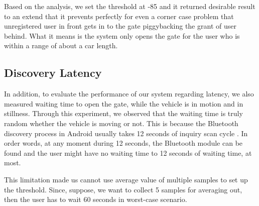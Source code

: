 Based on the analysis, we set the threshold at -85 and it returned desirable result to an extend that it prevents perfectly for even a corner case problem that unregistered user in front gets in to the gate piggybacking the grant of user behind. What it means is the system only opens the gate for the user who is within a range of about a car length.
\subsection{Discovery Latency}
In addition, to evaluate the performance of our system regarding latency, we also measured waiting time to open the gate, while the vehicle is in motion and in stillness. Through this experiment, we observed that the waiting time is truly random whether the vehicle is moving or not. This is because the Bluetooth discovery process in Android usually takes 12 seconds of inquiry scan cycle \cite {btcycle}. In order words, at any moment during 12 seconds, the Bluetooth module can be found and the user might have no waiting time to 12 seconds of waiting time, at most.

This limitation made us cannot use average value of multiple samples to set up the threshold. Since, suppose, we want to collect 5 samples for averaging out, then the user has to wait 60 seconds in worst-case scenario.
